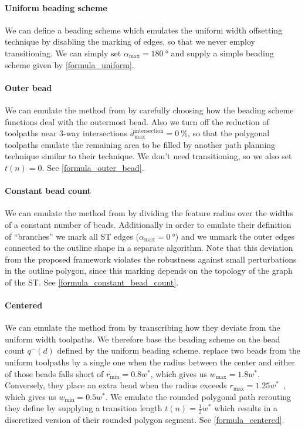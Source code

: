 \paragraph{Uniform beading scheme}
We can define a beading scheme which emulates the uniform width offsetting technique by disabling the marking of edges, so that we never employ transitioning.
{We can simply set $\alpha_\text{max} = \SI{180}{\degree}$ and supply a simple beading scheme given by} \cref{formula_uniform}.


\paragraph{Outer bead}
We can emulate the method from \citeauthor{Moesen2011} by carefully choosing how the beading scheme functions deal with the outermost bead.
Also we turn off the reduction of toolpaths near 3-way intersections $d_\text{max}^\text{intersection} = \SI{0}{\percent}$, so that the polygonal toolpaths emulate the remaining area to be filled by another path planning technique similar to their technique.
We don't need transitioning, so we also set $t(n) = 0 $.
See \cref{formula_outer_bead}.



\paragraph{Constant bead count}
We can emulate the method from \citeauthor{Ding2016a} by dividing the feature radius over the widths of a constant number of beads.
Additionally in order to emulate their definition of ``branches'' we mark all ST edges {($\alpha_\text{max} = \SI{0}{\degree}$) and }we unmark the outer edges connected to the outline shape in a separate algorithm.
Note that this deviation from the proposed framework violates the robustness against small perturbations in the outline polygon, since this marking depends on the topology of the graph of the ST.
See \cref{formula_constant_bead_count}.




\paragraph{Centered}
We can emulate the method from \citeauthor{Jin2017JMS} by transcribing how they deviate from the uniform width toolpaths.
We therefore base the beading scheme on the bead count $q^-(d)$ defined by the uniform beading scheme.
\citeauthor{Jin2017JMS} replace two beads from the uniform toolpaths by a single one when the radius between the center and either of those beads falls short of $r_\text{min} = 0.8 w^*${, which gives us $w_\text{max}=1.8 w^*$}.
Conversely, they place an extra bead when the radius exceeds $r_\text{max} = 1.25 w^*$~\cite{Jin2017JMS}{, which gives us $w_\text{min}=0.5 w^*$}.
We emulate the rounded polygonal path rerouting they define by supplying a transition length {$t(n) = \frac12 w^*$} which results in a discretized version of their rounded polygon segment.
See \cref{formula_centered}.






